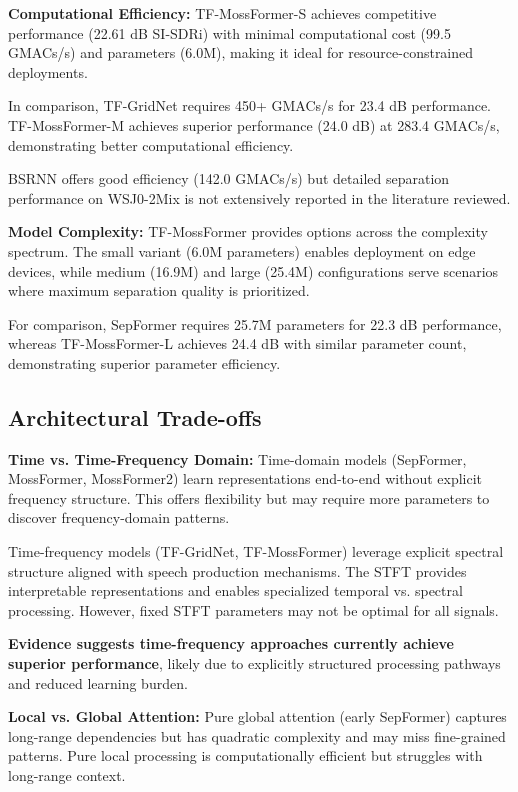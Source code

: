 \documentclass[conference]{IEEEtran}
\begin{document}
\textbf{Computational Efficiency:} TF-MossFormer-S achieves competitive performance (22.61 dB SI-SDRi) with minimal computational cost (99.5 GMACs/s) and parameters (6.0M), making it ideal for resource-constrained deployments.

In comparison, TF-GridNet requires 450+ GMACs/s for 23.4 dB performance. TF-MossFormer-M achieves superior performance (24.0 dB) at 283.4 GMACs/s, demonstrating better computational efficiency.

BSRNN offers good efficiency (142.0 GMACs/s) but detailed separation performance on WSJ0-2Mix is not extensively reported in the literature reviewed.

\textbf{Model Complexity:} TF-MossFormer provides options across the complexity spectrum. The small variant (6.0M parameters) enables deployment on edge devices, while medium (16.9M) and large (25.4M) configurations serve scenarios where maximum separation quality is prioritized.

For comparison, SepFormer requires 25.7M parameters for 22.3 dB performance, whereas TF-MossFormer-L achieves 24.4 dB with similar parameter count, demonstrating superior parameter efficiency.

\subsection{Architectural Trade-offs}

\textbf{Time vs. Time-Frequency Domain:} Time-domain models (SepFormer, MossFormer, MossFormer2) learn representations end-to-end without explicit frequency structure. This offers flexibility but may require more parameters to discover frequency-domain patterns.

Time-frequency models (TF-GridNet, TF-MossFormer) leverage explicit spectral structure aligned with speech production mechanisms. The STFT provides interpretable representations and enables specialized temporal vs. spectral processing. However, fixed STFT parameters may not be optimal for all signals.

\textbf{Evidence suggests time-frequency approaches currently achieve superior performance}, likely due to explicitly structured processing pathways and reduced learning burden.

\textbf{Local vs. Global Attention:} Pure global attention (early SepFormer) captures long-range dependencies but has quadratic complexity and may miss fine-grained patterns. Pure local processing is computationally efficient but struggles with long-range context.
\end{document}
